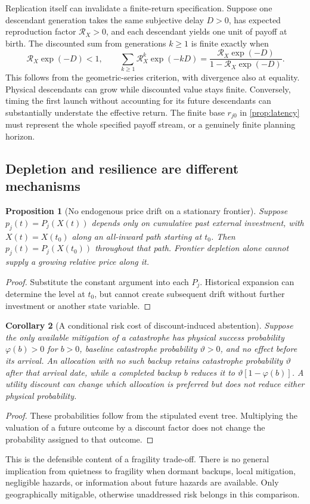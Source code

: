 \documentclass[11pt,a4paper]{article}
\newtheorem{proposition}{Proposition}
\newtheorem{corollary}[proposition]{Corollary}
\theoremstyle{definition}\newtheorem{definition}{Definition}
\begin{document}
Replication itself can invalidate a finite-return specification. Suppose
one descendant generation takes the same subjective delay $D>0$, has
expected reproduction factor $\mathcal R_X>0$, and each descendant yields
one unit of payoff at birth. The discounted sum from generations
$k\geq1$ is finite exactly when
\begin{equation}
 \mathcal R_X\exp(-D)<1,
 \qquad \sum_{k\geq1}\mathcal R_X^k\exp(-kD)
       =\frac{\mathcal R_X\exp(-D)}{1-\mathcal R_X\exp(-D)}.
 \label{eq:discounted-replication}
\end{equation}
This follows from the geometric-series criterion, with divergence also
at equality. Physical descendants can grow while discounted value stays
finite. Conversely, timing the first launch without accounting for its
future descendants can substantially understate the effective return.
The finite base $r_{j0}$ in \cref{prop:latency} must represent the whole
specified payoff stream, or a genuinely finite planning horizon.

\subsection{Depletion and resilience are different mechanisms}
\begin{proposition}[No endogenous price drift on a stationary frontier]
\label{prop:depletion}
Suppose $p_j(t)=P_j(X(t))$ depends only on cumulative past external
investment, with $X(t)=X(t_0)$ along an all-inward path starting at $t_0$.
Then $p_j(t)=P_j(X(t_0))$ throughout that path. Frontier depletion alone
cannot supply a growing relative price along it.
\end{proposition}
\begin{proof}
Substitute the constant argument into each $P_j$. Historical expansion
can determine the level at $t_0$, but cannot create subsequent drift
without further investment or another state variable.
\end{proof}

\begin{corollary}[A conditional risk cost of discount-induced abstention]
\label{cor:quiet-risk}
Suppose the only available mitigation of a catastrophe has physical
success probability $\varphi(b)>0$ for $b>0$, baseline catastrophe
probability $\vartheta>0$, and no effect before its arrival. An allocation
with no such backup retains catastrophe probability $\vartheta$ after
that arrival date, while a completed backup $b$ reduces it to
$\vartheta[1-\varphi(b)]$. A utility discount can change which allocation
is preferred but does not reduce either physical probability.
\end{corollary}
\begin{proof}
These probabilities follow from the stipulated event tree. Multiplying
the valuation of a future outcome by a discount factor does not change
the probability assigned to that outcome.
\end{proof}
This is the defensible content of a fragility trade-off. There is no
general implication from quietness to fragility when dormant backups,
local mitigation, negligible hazards, or information about future hazards
are available. Only geographically mitigable, otherwise unaddressed risk
belongs in this comparison.
\end{document}
